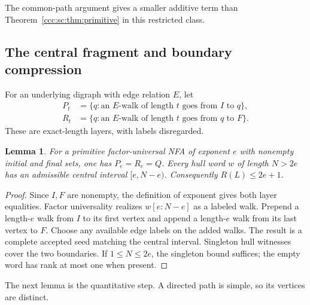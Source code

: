 \documentclass[11pt,letterpaper]{article}
\newtheorem{lemma}[theorem]{Lemma}
\theoremstyle{definition}
\theoremstyle{remark}
\begin{document}
The common-path argument gives a smaller additive term than Theorem~\ref{ccc:sc:thm:primitive} in this restricted class.

\subsection{The central fragment and boundary compression}

For an underlying digraph with edge relation $E$, let
\[
 \begin{aligned}
 P_t&=\{q:\text{an $E$-walk of length $t$ goes from $I$ to $q$}\},\\
 R_t&=\{q:\text{an $E$-walk of length $t$ goes from $q$ to $F$}\}.
 \end{aligned}
\]
These are exact-length layers, with labels disregarded.

\begin{lemma}\label{ccc:sc:lem:central}
For a primitive factor-universal NFA of exponent $e$ with nonempty initial and final sets, one has $P_e=R_e=Q$. Every hull word $w$ of length $N>2e$ has an admissible central interval $[e,N-e)$. Consequently $R(L)\le2e+1$.
\end{lemma}
\begin{proof}
Since $I,F$ are nonempty, the definition of exponent gives both layer equalities. Factor universality realizes $w[e:N-e]$ as a labeled walk. Prepend a length-$e$ walk from $I$ to its first vertex and append a length-$e$ walk from its last vertex to $F$. Choose any available edge labels on the added walks. The result is a complete accepted seed matching the central interval. Singleton hull witnesses cover the two boundaries. If $1\le N\le2e$, the singleton bound suffices; the empty word has rank at most one when present.
\end{proof}

The next lemma is the quantitative step. A directed path is simple, so its vertices are distinct.
\end{document}
